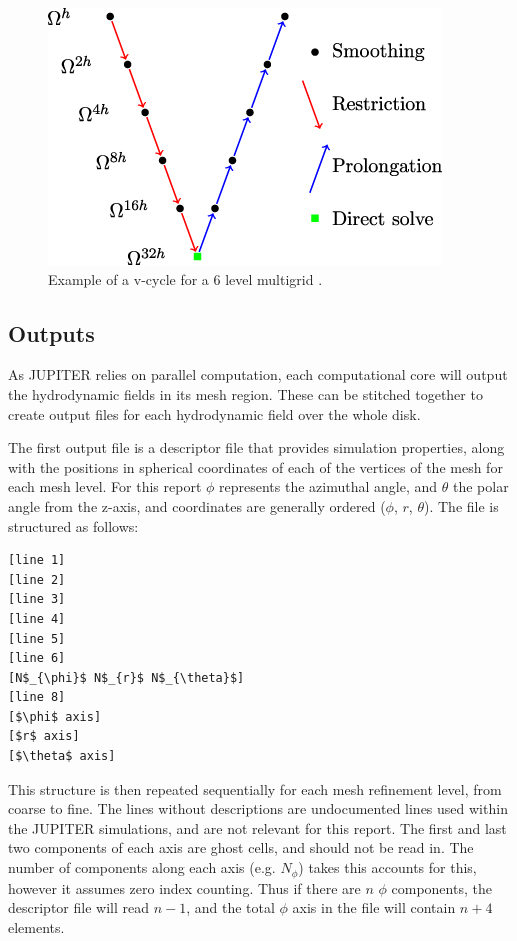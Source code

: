 \documentclass[preprint2]{aastex62}
\begin{document}
\begin{figure}
	\includegraphics[width=\linewidth]{figures/Presentation/vcycle.jpg}
	\caption{\label{fig:vcycle} Example of a v-cycle for a 6 level multigrid \cite{vcycle}.}
\end{figure}

\subsection{Outputs}\label{sec:out}
As JUPITER relies on parallel computation, each computational core will output the hydrodynamic fields in its mesh region. These can be stitched together to create output files for each hydrodynamic field over the whole disk.

The first output file is a descriptor file that provides simulation properties, along with the positions in spherical coordinates of each of the vertices of the mesh for each mesh level. 
For this report $\phi$ represents the azimuthal angle, and $\theta$ the polar angle from the z-axis, and coordinates are generally ordered ($\phi$, $r$, $\theta$). 
The file is structured as follows:
\begin{lstlisting}
[line 1]
[line 2]
[line 3]
[line 4]
[line 5]
[line 6]
[N$_{\phi}$ N$_{r}$ N$_{\theta}$]
[line 8]
[$\phi$ axis]
[$r$ axis]
[$\theta$ axis]
\end{lstlisting}
This structure is then repeated sequentially for each mesh refinement level, from coarse to fine. The lines without descriptions are undocumented lines used within the JUPITER simulations, and are not relevant for this report. The first and last two components of each axis are ghost cells, and should not be read in. The number of components along each axis (e.g. $N_{\phi}$) takes this accounts for this, however it assumes zero index counting. Thus if there are $n$ $\phi$ components, the descriptor file will read $n-1$, and the total $\phi$ axis in the file will contain $n+4$ elements.
\end{document}
